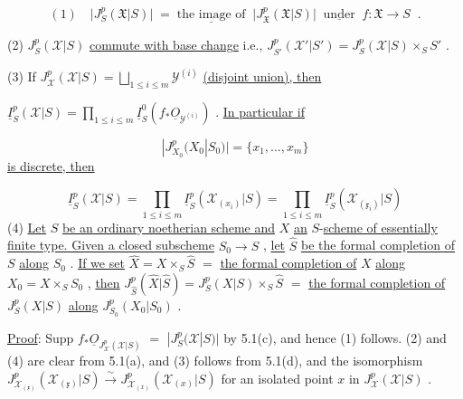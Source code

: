 \begin{equation*}
(1)\quad \big|J^{p}_{S}(\mathfrak{X}|S)\big| \;=\; \underline{\text{the image of}} \;\; \big|J^{p}_{\mathfrak{X}}(\mathfrak{X}|S)\big| \;\; \underline{\text{under}} \;\; f : \mathfrak{X} \to S \;\;.
\end{equation*}


(2)  $J^p_S(\mathcal{X}|S)$  \underline{commute with base change}  i.e.,  $J^p_{S'}(\mathcal{X}'|S') = J^p_S(\mathcal{X}|S) \times_S S'$  .

(3)  If  $J^p_{\mathcal{X}}(\mathcal{X}|S) = \bigsqcup_{1\leq i\leq m} \mathcal{Y}^{(i)}$  \underline{(disjoint union), then}

$\underline{I}^p_S(\mathcal{X}|S) = \prod_{1\leq i\leq m} \underline{I}^0_S(f_*\underline{O}_{\mathcal{Y}^{(i)}})$  . \underline{In particular if}

\begin{equation*}
|J^p_{X_0}(X_0|S_0)| = \{x_1,\ldots,x_m\}
\end{equation*}
\underline{is discrete, then}

\begin{equation*}
\underline{I}^p_S(\mathcal{X}|S) = \prod_{1\leq i\leq m} \underline{I}^p_S(\mathcal{X}_{(x_i)}|S) = \prod_{1\leq i\leq m} \underline{I}^p_S(\mathcal{X}_{(\mathfrak{x}_i)}|S)
\end{equation*}
(4)  \underline{Let}  $S$  \underline{be an ordinary noetherian scheme and}  $X$  \underline{an} $S$-\underline{scheme of essentially finite type. Given a closed subscheme}  $S_0 \to S$  , \underline{let}  $\hat{S}$  \underline{be the formal completion of}  $S$  \underline{along}  $S_0$  . \underline{If we set}  $\hat{X} = X \times_S \hat{S}$ $=$ \underline{the formal completion of}  $X$  \underline{along}  $X_0 = X \times_S S_0$  , \underline{then}  $J^p_{\hat{S}}(\hat{X}|\hat{S}) = J^p_S(X|S) \times_S \hat{S}$ $=$ \underline{the formal completion of}  $J^p_S(X|S)$  \underline{along}  $J^p_{S_0}(X_0|S_0)$  .

\underline{Proof}:  Supp $f_*\underline{O}_{J^p_{\mathcal{X}}(\mathcal{X}|S)}$ $=$ $|J^p_S(\mathcal{X}|S)|$  by 5.1(c), and hence (1) follows. (2) and (4) are clear from 5.1(a), and (3) follows from 5.1(d), and the isomorphism $J^p_{\mathcal{X}_{(\mathfrak{x})}}(\mathcal{X}_{(\mathfrak{x})}|S) \xrightarrow{\sim} J^p_{\mathcal{X}_{(x)}}(\mathcal{X}_{(x)}|S)$  for an isolated point  $x$  in  $J^p_{\mathcal{X}}(\mathcal{X}|S)$  .


